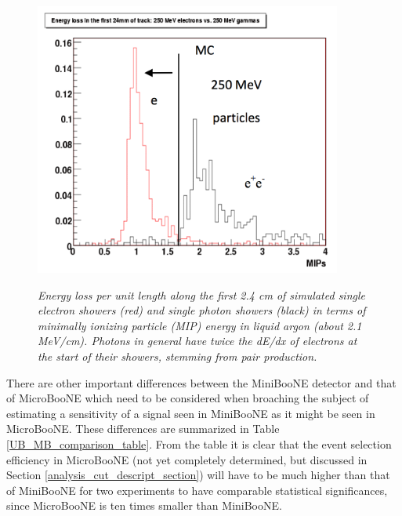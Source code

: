 \begin{figure}[ht!]
\centering
	\includegraphics[width=0.9\textwidth]{Figures/UB_TDR_egamma_dedx.png} \\
\caption{\textit{Energy loss per unit length along the first 2.4 cm of simulated single electron showers (red) and single photon showers (black) in terms of minimally ionizing particle (MIP) energy in liquid argon (about 2.1 MeV/cm). Photons in general have twice the dE/dx of electrons at the start of their showers, stemming from pair production.}}\label{UB_TDR_egammadedx_fig}
\end{figure}

There are other important differences between the MiniBooNE detector and that of MicroBooNE which need to be considered when broaching the subject of estimating a sensitivity of a signal seen in MiniBooNE as it might be seen in MicroBooNE. These differences are summarized in Table \ref{UB_MB_comparison_table}. From the table it is clear that the event selection efficiency in MicroBooNE (not yet completely determined, but discussed in Section \ref{analysis_cut_descript_section}) will have to be much higher than that of MiniBooNE for two experiments to have comparable statistical significances, since MicroBooNE is ten times smaller than MiniBooNE. 

